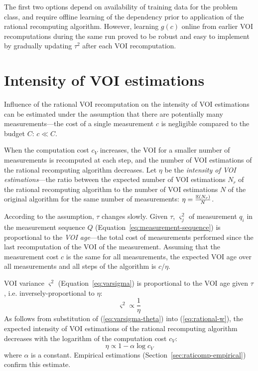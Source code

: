 The first two options depend on availability of training data for the
problem class, and require offline learning of the dependency prior to
application of the rational recomputing algorithm. However, learning
$g(c)$ online from earlier VOI recomputations during
the same run proved to be robust and easy to implement by gradually
updating $\tau^2$ after each VOI recomputation.

\section{Intensity of VOI estimations}
\label{sec:raticomp-comptime}

Influence of the rational VOI recomputation on the intensity of VOI estimations
can be estimated under the assumption that there are potentially many
measurements---the cost of a single measurement $c$ is negligible
compared to the budget $C$: $c \ll C$.

When the computation cost $c_V$ increases, the VOI for a smaller
number of measurements is recomputed at each step, and the number of
VOI estimations of the rational recomputing algorithm decreases. Let
$\eta$ be the \textit{intensity of VOI estimations}---the ratio
between the expected number of VOI estimations $N_r$ of the rational
recomputing algorithm to the number of VOI estimations $N$ of the
original algorithm for the same number of measurements: $\eta=\frac
{\mathbb{E}(N_r)} N$.

According to the assumption, $\tau$ changes slowly. Given $\tau$,
$\varsigma_j^2$ of measurement $q_i$ in the measurement sequence $Q$
(Equation~\ref{eq:measurement-sequence}) is proportional to
the {\em VOI age}---the total cost of measurements performed since the
last recomputation of the VOI of the measurement. Assuming that the
measurement cost $c$ is the same for all measurements, the expected
VOI age over all measurements and all steps of the algorithm is
$c/\eta$. 

VOI variance $\varsigma^2$ (Equation~\ref{eq:varsigma}) is proportional to
the VOI age given $\tau$, i.e. inversely-proportional to $\eta$:
\begin{equation}
\varsigma^2 \propto \frac 1 \eta
\label{eq:varsigma-theta}
\end{equation}
As follows from substitution of (\ref{eq:varsigma-theta}) into
(\ref{eq:rational-w}), the expected intensity of VOI estimations of the rational
recomputing algorithm decreases with the logarithm of the computation
cost $c_V$:
\begin{equation}
\eta \propto 1-\alpha\log c_V
\label{eq:eta}
\end{equation}
where $\alpha$ is a constant.  Empirical estimations
(Section~\ref{sec:raticomp-empirical}) confirm this estimate.

